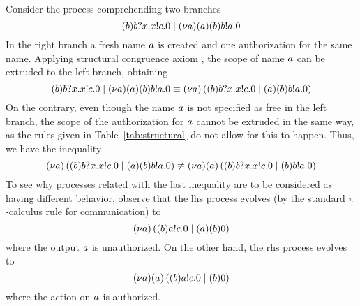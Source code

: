 \begin{example}
\label{ex:scope_extrusion}
   Consider the process comprehending two branches 
   \[
      (b) b?x.x!c.0 \;|\; (\nu a) (a)  (b) b!a.0
   \]
   In the right branch a fresh name $a$ is created and one authorization for the same name. 
   Applying structural congruence axiom , the scope of name $a$ can be extruded to the left branch, obtaining
      \[
         (b) b?x.x!c.0 \;|\; (\nu a) (a)  (b) b!a.0
         \equiv
          (\nu a) \left((b) b?x.x!c.0 \;|\;  (a) (b) b!a.0\right)
        \]
  On the contrary, even though the name $a$ is not specified as free in the left branch, the scope of the authorization for $a$ cannot be extruded in the same way, as the rules given in Table~\ref{tab:structural} do not allow for this to happen. Thus, we have the inequality
      \[
        (\nu a) \left((b) b?x.x!c.0 \;|\;  (a) (b) b!a.0\right)
        \not\equiv
       (\nu a) (a) \left((b) b?x.x!c.0 \;|\;  (b) b!a.0\right)
       \]
   To see why processes related with the last inequality are to be considered as having different behavior, observe that the lhs process evolves (by the standard $\pi$-calculus rule for communication)  to 
     \[
                (\nu a) \left((b) a!c.0 \;|\;  (a) (b) 0\right)
     \]
     where the output $a$ is unauthorized. On the other hand, the rhs process evolves to
    \[
              (\nu a) (a) \left((b) a!c.0 \;|\; (b) 0\right)
     \]
     where the action on $a$ is authorized.
\end{example}

